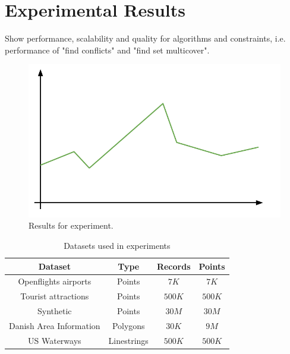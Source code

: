 \section{Experimental Results}


Show performance, scalability and quality for algorithms and constraints, i.e. performance of "find conflicts" and "find set multicover".

\begin{figure}[htbp]
\begin{center}
\includegraphics[scale=.5]{figs/cvl_todo.pdf}
\caption{Results for experiment.}
\label{fig:results-x}
\end{center}
\end{figure}

\begin{table}[htdp]
\caption{Datasets used in experiments}
\begin{center}
\begin{tabular}{|c|c|c|c|}
\hline
\textbf{Dataset} & \textbf{Type} & \textbf{Records} & \textbf{Points} \\
\hline
Openflights airports & Points & $7K$ & $7K$ \\
Tourist attractions & Points & $500K$ & $500K$ \\
Synthetic & Points & $30M$ & $30M$ \\
Danish Area Information & Polygons & $30K$ & $9M$ \\
US Waterways & Linestrings & $500K$ & $500K$ \\
\hline
\end{tabular}
\end{center}
\label{default}
\end{table}%

